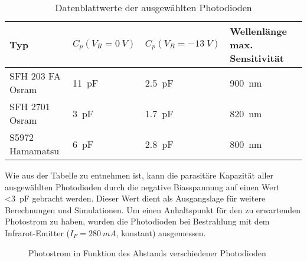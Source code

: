 \begin{table}[H]
\begin{tabular}{|l|l|l|l|}
	\hline 
	\textbf{Typ}&\textbf{$C_{p} (V_{R}=\SI{0}{V})$}  & \textbf{$C_{p} (V_{R}=\SI{-13}{V})$} & \textbf{Wellenlänge max. Sensitivität} \\ 
	\hline 
	SFH 203 FA Osram&\SI{11}{pF}  & \SI{2.5}{pF} & \SI{900}{nm} \\ 
	\hline 
	SFH 2701 Osram&\SI{3}{pF}  &\SI{1.7}{pF}  &\SI{820}{nm}  \\ 
	\hline 
	S5972 Hamamatsu&\SI{6}{pF}  &\SI{2.8}{pF}  &\SI{800}{nm}  \\ 
	\hline 
\end{tabular} 
\caption{Datenblattwerte der ausgewählten Photodioden}\label{tab:Tabelle_Photo}
\end{table}

Wie aus der Tabelle zu entnehmen ist, kann die parasitäre Kapazität aller ausgewählten Photodioden durch die negative Biasspannung auf einen Wert \textless \SI{3}{pF} gebracht werden. Dieser Wert dient als Ausgangslage für weitere Berechnungen und Simulationen.
\newline
Um einen Anhaltspunkt für den zu erwartenden Photostrom zu haben, wurden die Photodioden bei Bestrahlung mit dem Infrarot-Emitter ($I_{F}=\SI{280}{mA}$, konstant) ausgemessen.

\begin{figure}[h]
\centering
{}
\caption{Photostrom in Funktion des Abstands verschiedener Photodioden}\label{fig:Plot_Photo}
\end{figure}

